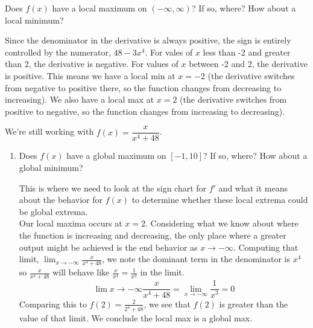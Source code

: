 \documentclass{article}
\begin{document}
\begin{enumerate}
\begin{enumerate}
    \begin{problem}[\nstretch{0.75}]
      Does $f(x)$ have a local maximum on $(-\infty, \infty)$? If so, where? How about a local minimum?
    \end{problem}
\begin{solution}
    Since the denominator in the derivative is always positive, the sign is entirely controlled by the numerator, $48-3x^4$. For vales of $x$ less than -2 and greater than 2, the derivative is negative. For values of $x$ between -2 and 2, the derivative is positive. This means we have a local min at $x=-2$ (the derivative switches from negative to positive there, so the function changes from decreasing to increasing). We also have a local max at $x=2$ (the derivative switches from positive to negative, so the function changes from increasing to decreasing). 
\end{solution}
  \end{enumerate}

  \begin{problemonly}
    We're still working with $f(x) = \dfrac{x}{x^4 + 48}$.
  \end{problemonly}

  \begin{enumerate}[resume]
  \item
    \begin{problem}[\vfill]
      Does $f(x)$ have a global maximum on $[-1, 10]$? If so, where? How about a global minimum?
    \end{problem}

\begin{solution}
    This is where we need to look at the sign chart for $f'$ and what it means about the behavior for $f(x)$ to determine whether these local extrema could be global extrema. \\
    Our local maxima occurs at $x=2$. Considering what we know about where the function is increasing and decreasing, the only place where a greater output might be achieved is the end behavior as $x\to -\infty$. Computing that limit, $\displaystyle \lim_{x\to -\infty} \frac{x}{x^4+48}$, we note the dominant term in the denominator is $x^4$ so $\frac{x}{x^4+48}$ will behave like $\frac{x}{x^4}=\frac{1}{x^3}$ in the limit. 
    $$\displaystyle \lim{x\to -\infty} \frac{x}{x^4+48}=\lim_{x\to-\infty}\frac{1}{x^3} = 0$$
    Comparing this to $f(2)=\frac{2}{2^4+48}$, we see that $f(2)$ is greater than the value of that limit. We conclude the local max is a global max.\\


\end{solution}
\end{enumerate}
\end{enumerate}
\end{document}
